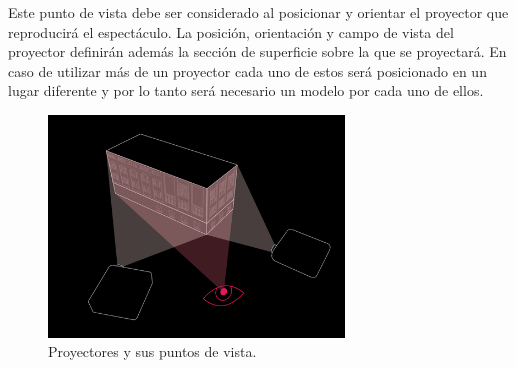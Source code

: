 Este punto de vista debe ser considerado al posicionar y orientar el proyector que reproducirá el espectáculo.
La posición, orientación y campo de vista del proyector definirán además la sección de superficie sobre la que se proyectará.
En caso de utilizar más de un proyector cada uno de estos será posicionado en un lugar diferente y por lo tanto será necesario un modelo por cada uno de ellos.

\begin{figure}[H]
  \centering
    \includegraphics[width=0.7\textwidth]{./Cap2_videomapping/diagrama-2proyectores}
  \caption{Proyectores y sus puntos de vista.}%
  \label{fig:diagrama-2proyectores}
\end{figure}

